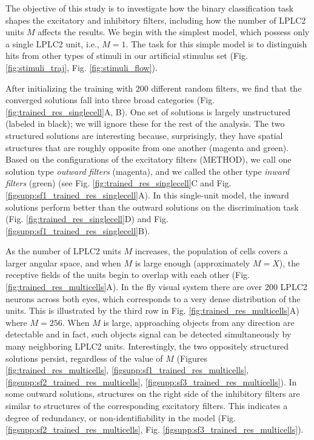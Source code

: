 \documentclass[pdftex,9pt,lineno]{elife}
\begin{document}
The objective of this study is to investigate how the binary classification task shapes the excitatory and inhibitory filters, including how the number of LPLC2 units $M$ affects the results. We begin with the simplest model, which possess only a single LPLC2 unit, i.e., $M=1$. The task for this simple model is to distinguish hits from other types of stimuli in our artificial stimulus set (Fig. \ref{fig:stimuli_traj}, Fig. \ref{fig:stimuli_flow}).

After initializing the training with 200 different random filters, we find that the converged solutions fall into three broad categories (Fig. \ref{fig:trained_res_singlecell}A, B). One set of solutions is largely unstructured (labeled in black); we will ignore these for the rest of the analysis. The two structured solutions are interesting because, surprisingly, they have  spatial structures that are roughly opposite from one another (magenta and green). Based on the configurations of the excitatory filters (METHOD), we call one solution type \textit{outward filters}   (magenta), and we called the other type \textit{inward filters} (green) (see Fig. \ref{fig:trained_res_singlecell}C and Fig. \ref{figsupp:sf1_trained_res_singlecell}A). In this single-unit model, the inward solutions perform better than the outward solutions on the discrimination task (Fig. \ref{fig:trained_res_singlecell}D) and Fig. \ref{figsupp:sf1_trained_res_singlecell}B).


As the number of LPLC2 units $M$ increases, the population of cells covers a larger angular space, and when $M$ is large enough (approximately $M=X$), the receptive fields of the units begin to overlap with each other (Fig. \ref{fig:trained_res_multicells}A). In the fly visual system there are over 200 LPLC2 neurons across both eyes, which corresponds to a very dense distribution of the units. This is illustrated by the third row in Fig. \ref{fig:trained_res_multicells}A) where $M=256$. When $M$ is large, approaching objects from any direction are detectable and in fact, such objects signal can be detected simultaneously by many neighboring LPLC2 units. Interestingly, the two oppositely structured solutions persist, regardless of the value of $M$ (Figures \ref{fig:trained_res_multicells},  \ref{figsupp:sf1_trained_res_multicells}, \ref{figsupp:sf2_trained_res_multicells},  \ref{figsupp:sf3_trained_res_multicells}). In some outward solutions, structures on the right side of the inhibitory filters are similar to structures of the corresponding excitatory filters. This indicates a degree of redundancy, or non-identifiability in the model (Fig. \ref{figsupp:sf2_trained_res_multicells}, Fig. \ref{figsupp:sf3_trained_res_multicells}).
\end{document}
